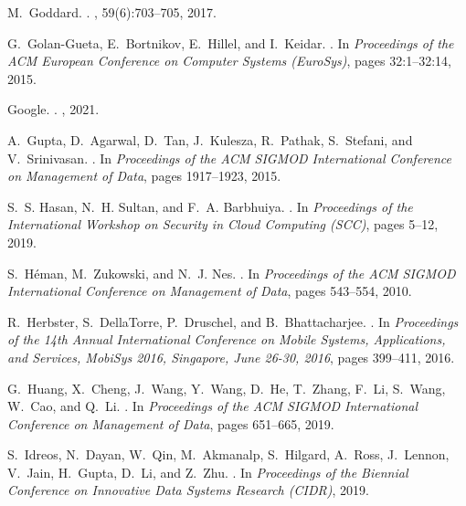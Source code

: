 \documentclass[11pt,dvipdfmx]{article}
\begin{document}
\begin{thebibliography}{10}
\begin{small}
  M.~Goddard.
  .
  , 59(6):703--705, 2017.
  
  G.~Golan-Gueta, E.~Bortnikov, E.~Hillel, and I.~Keidar.
  .
  \newblock In {\em Proceedings of the ACM European Conference on Computer
    Systems (EuroSys)}, pages 32:1--32:14, 2015.
  
  Google.
  .
  , 2021.
  
  A.~Gupta, D.~Agarwal, D.~Tan, J.~Kulesza, R.~Pathak, S.~Stefani, and
    V.~Srinivasan.
  .
  \newblock In {\em Proceedings of the ACM SIGMOD International Conference on
    Management of Data}, pages 1917--1923, 2015.
  
  S.~S. Hasan, N.~H. Sultan, and F.~A. Barbhuiya.
  .
  \newblock In {\em Proceedings of the International Workshop on Security in
    Cloud Computing (SCC)}, pages 5--12, 2019.
  
  S.~H{\'{e}}man, M.~Zukowski, and N.~J. Nes.
  .
  \newblock In {\em Proceedings of the ACM SIGMOD International Conference on
    Management of Data}, pages 543--554, 2010.
  
  \newpage
  R.~Herbster, S.~DellaTorre, P.~Druschel, and B.~Bhattacharjee.
  .
  \newblock In {\em Proceedings of the 14th Annual International Conference on
    Mobile Systems, Applications, and Services, MobiSys 2016, Singapore, June
    26-30, 2016}, pages 399--411, 2016.
  
  G.~Huang, X.~Cheng, J.~Wang, Y.~Wang, D.~He, T.~Zhang, F.~Li, S.~Wang, W.~Cao,
    and Q.~Li.
  .
  \newblock In {\em Proceedings of the ACM SIGMOD International Conference on
    Management of Data}, pages 651--665, 2019.
  
  S.~Idreos, N.~Dayan, W.~Qin, M.~Akmanalp, S.~Hilgard, A.~Ross, J.~Lennon,
    V.~Jain, H.~Gupta, D.~Li, and Z.~Zhu.
  .
  \newblock In {\em Proceedings of the Biennial Conference on Innovative Data
    Systems Research (CIDR)}, 2019.
  

\end{small}
\end{thebibliography}
\end{document}

